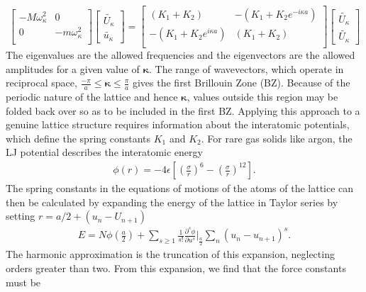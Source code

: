 %
\begin{equation}
\begin{bmatrix}
  -M\omega_\kappa^2 & 0\\
  0 & -m\omega_\kappa^2\\ 
 \end{bmatrix}
\begin{bmatrix}
\tilde{U_\kappa} \\ 
\tilde{u_\kappa}
\end{bmatrix}
=
\begin{bmatrix}
  (K_1+K_2) & -(K_1+K_2e^{-i\kappa a})\\
  -(K_1+K_2e^{i\kappa a}) & (K_1+K_2) \\ 
 \end{bmatrix}
\begin{bmatrix}
\tilde{U_\kappa} \\ \tilde{U_\kappa}
\end{bmatrix}
\end{equation}
%
The eigenvalues are the allowed frequencies and the eigenvectors are the allowed amplitudes for a given value of $\pmb{\kappa}$. The range of wavevectors, which operate in reciprocal space,  $\frac{-\pi}{a}\leq \pmb{\kappa}\leq\frac{\pi}{a}$ gives the first Brillouin Zone (BZ). Because of the periodic nature of the lattice and hence $\pmb{\kappa}$, values outside this region may be folded back over so as to be included in the first BZ.
Applying this approach to a genuine lattice structure requires information about the interatomic potentials, which define the spring constants $K_1$ and $K_2$. For rare gas solids like argon, the LJ potential describes the interatomic energy
\begin{align}
	\phi(r)=-4\epsilon\left[\left(\frac{\sigma}{r}\right)^6-\left(\frac{\sigma}{r}\right)^{12}\right].
\end{align}
The spring constants in the equations of motions of the atoms of the lattice can then be calculated by expanding the energy of the lattice in Taylor series by setting $r=a/2+(u_n-U_{n+1})$
%
\begin{equation}\label{EQ:eng_exp}
\begin{split}
	E=N\phi \left(\frac{a}{2}\right)+\sum_{s\geq1}\frac{1}{s!}\frac{\partial^s\phi}{\partial u^s} \bigg|_{\frac{a}{2}} \sum_n(u_n-u_{n+1})^s.
\end{split}
\end{equation}
%
The harmonic approximation is the truncation of this expansion, neglecting orders greater than two. From this expansion, we find that the force constants must be
